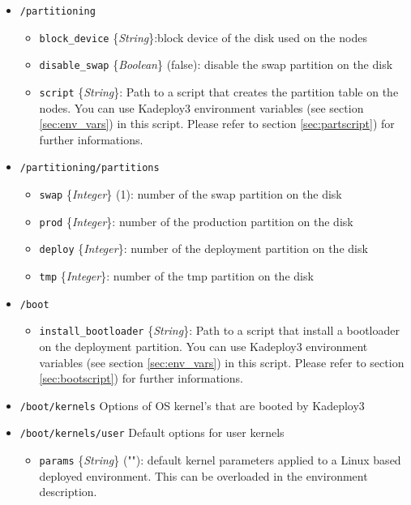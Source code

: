 \documentclass[a4wide,10pt,oneside]{book}
\newcommand{\ypath}[1]{\texttt{#1}}
\newcommand{\yfield}[2]{\texttt{#1} {\small\{{\emph{#2}}\}}:}
\newcommand{\yfieldd}[3]{\texttt{#1} {\small\{{\emph{#2}}\}} {\small(}#3{\small)}:}
\begin{document}
\begin{itemize}
  \item \ypath{/partitioning}
  \begin{itemize}
    \item \yfield{block\_device}{String}block device of the disk used on the nodes
    \item \yfieldd{disable\_swap}{Boolean}{false} disable the swap partition on the disk
    \item \yfield{script}{String} Path to a script that creates the partition table on the nodes. You can use Kadeploy3 environment variables (see section \ref{sec:env_vars}) in this script. Please refer to section \ref{sec:partscript}) for further informations.
  \end{itemize}

  \item \ypath{/partitioning/partitions}
  \begin{itemize}
    \item \yfieldd{swap}{Integer}{1} number of the swap partition on the disk
    \item \yfield{prod}{Integer} number of the production partition on the disk
    \item \yfield{deploy}{Integer} number of the deployment partition on the disk
    \item \yfield{tmp}{Integer} number of the tmp partition on the disk
  \end{itemize}

  \item \ypath{/boot}
  \begin{itemize}
    \item \yfield{install\_bootloader}{String} Path to a script that install a bootloader on the deployment partition. You can use Kadeploy3 environment variables (see section \ref{sec:env_vars}) in this script. Please refer to section \ref{sec:bootscript}) for further informations.
  \end{itemize}

  \item \ypath{/boot/kernels} Options of OS kernel's that are booted by Kadeploy3
  \item \ypath{/boot/kernels/user} Default options for user kernels
  \begin{itemize}
    \item \yfieldd{params}{String}{""} default kernel parameters applied to a Linux based deployed environment. This can be overloaded in the environment description.
  \end{itemize}


\end{itemize}
\end{document}
